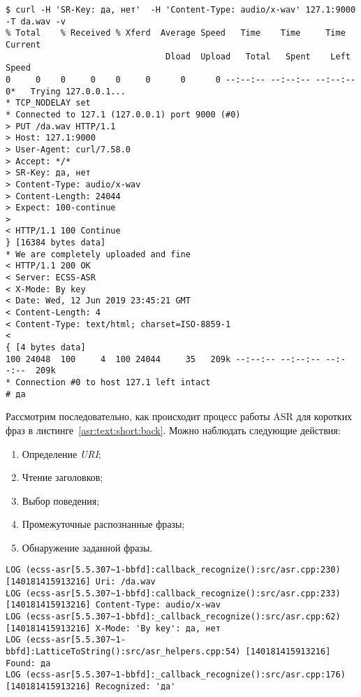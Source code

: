 \begin{lstlisting}[caption={Поиск по ключевым фразам: да, нет}, label={asr:test:short:yes}]
$ curl -H 'SR-Key: да, нет'  -H 'Content-Type: audio/x-wav' 127.1:9000 -T da.wav -v
% Total    % Received % Xferd  Average Speed   Time    Time     Time  Current
                                Dload  Upload   Total   Spent    Left  Speed
0     0    0     0    0     0      0      0 --:--:-- --:--:-- --:--:--     0*   Trying 127.0.0.1...
* TCP_NODELAY set
* Connected to 127.1 (127.0.0.1) port 9000 (#0)
> PUT /da.wav HTTP/1.1
> Host: 127.1:9000
> User-Agent: curl/7.58.0
> Accept: */*
> SR-Key: да, нет
> Content-Type: audio/x-wav
> Content-Length: 24044
> Expect: 100-continue
>
< HTTP/1.1 100 Continue
} [16384 bytes data]
* We are completely uploaded and fine
< HTTP/1.1 200 OK
< Server: ECSS-ASR
< X-Mode: By key
< Date: Wed, 12 Jun 2019 23:45:21 GMT
< Content-Length: 4
< Content-Type: text/html; charset=ISO-8859-1
<
{ [4 bytes data]
100 24048  100     4  100 24044     35   209k --:--:-- --:--:-- --:--:--  209k
* Connection #0 to host 127.1 left intact
# да

\end{lstlisting}

Рассмотрим последовательно, как происходит процесс работы ASR для коротких фраз
в листинге~\ref{asr:text:short:back}. Можно наблюдать следующие действия:
\begin{enumerate}
    \item Определение \textit{URI};
    \item Чтение заголовков;
    \item Выбор поведения;
    \item Промежуточные распознанные фразы;
    \item Обнаружение заданной фразы.
\end{enumerate}

\begin{lstlisting}[caption={Процесс ASR для поиска ключевых фраз},label={asr:text:short:back}]
LOG (ecss-asr[5.5.307~1-bbfd]:callback_recognize():src/asr.cpp:230) [140181415913216] Uri: /da.wav
LOG (ecss-asr[5.5.307~1-bbfd]:callback_recognize():src/asr.cpp:233) [140181415913216] Content-Type: audio/x-wav
LOG (ecss-asr[5.5.307~1-bbfd]:_callback_recognize():src/asr.cpp:62) [140181415913216] X-Mode: 'By key': да, нет
LOG (ecss-asr[5.5.307~1-bbfd]:LatticeToString():src/asr_helpers.cpp:54) [140181415913216] Found: да
LOG (ecss-asr[5.5.307~1-bbfd]:_callback_recognize():src/asr.cpp:176) [140181415913216] Recognized: 'да'

\end{lstlisting}


